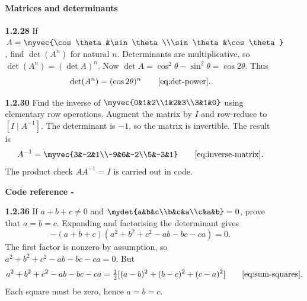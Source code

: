\begin{enumerate}[label={},leftmargin=0pt]
\begin{enumerate}[label={},leftmargin=0pt,itemsep=9pt]
\paragraph*{Matrices and determinants}
\setcounter{enumii}{28}
\setcounter{equation}{0}
\item[\textbf{1.2.28}] If $A=\myvec{\cos\theta&\sin\theta\\\sin\theta&\cos\theta}$, find $\det(A^n)$ for natural $n$.
\solution Determinants are multiplicative, so $\det(A^n)=(\det A)^n$. Now $\det A=\cos^2\theta-\sin^2\theta=\cos2\theta$. Thus
\[
\det(A^n)=(\cos2\theta)^n\qquad\eqref{eq:det-power}.
\]

\setcounter{enumii}{30}
\setcounter{equation}{0}
\item[\textbf{1.2.30}] Find the inverse of $\myvec{0&1&2\\1&2&3\\3&1&0}$ using elementary row operations.
\solution Augment the matrix by $I$ and row-reduce to $[I\mid A^{-1}]$. The determinant is $-1$, so the matrix is invertible. The result is
\[
A^{-1}=\myvec{3&-2&1\\-9&6&-2\\5&-3&1}\qquad\eqref{eq:inverse-matrix}.
\]
The product check $AA^{-1}=I$ is carried out in code.
\par\smallskip
\noindent\textbf{Code reference -}
\par\noindent{}
\par\smallskip

\setcounter{enumii}{36}
\setcounter{equation}{0}
\item[\textbf{1.2.36}] If $a+b+c\ne0$ and $\mydet{a&b&c\\b&c&a\\c&a&b}=0$, prove that $a=b=c$.
\solution Expanding and factorising the determinant gives
\[
-(a+b+c)(a^2+b^2+c^2-ab-bc-ca)=0.
\]
The first factor is nonzero by assumption, so $a^2+b^2+c^2-ab-bc-ca=0$. But
\[
a^2+b^2+c^2-ab-bc-ca=\tfrac12[(a-b)^2+(b-c)^2+(c-a)^2]\qquad\eqref{eq:sum-squares}.
\]
Each square must be zero, hence $a=b=c$.


\end{enumerate}
\end{enumerate}
